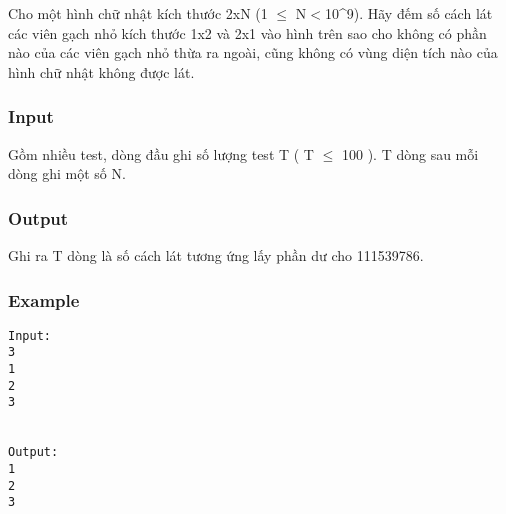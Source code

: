 



   Cho một hình chữ nhật kích thước 2xN (1 $\le$ N$<$10\textasciicircum9). Hãy đếm số cách lát các viên gạch nhỏ kích thước 1x2 và 2x1 vào hình trên sao cho không có phần nào của các viên gạch nhỏ thừa ra ngoài, cũng không có vùng diện tích nào của hình chữ nhật không được lát.  

\subsubsection{   Input  }

   Gồm nhiều test, dòng đầu ghi số lượng test T ( T $\le$ 100 ). T dòng sau mỗi dòng ghi một số N.  

\subsubsection{   Output  }

   Ghi ra T dòng là số cách lát tương ứng lấy phần dư cho 111539786.  

\subsubsection{   Example  }
\begin{verbatim}
Input:
3
1
2
3


Output:
1
2
3

\end{verbatim}
